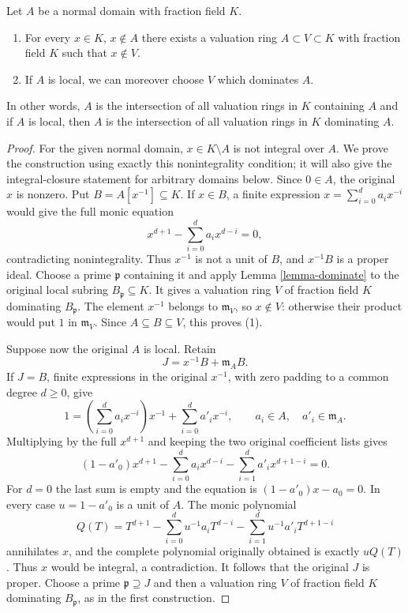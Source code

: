 \begin{lemma}
\label{lemma-find-valuation-rings}
Let $A$ be a normal domain with fraction field $K$.
\begin{enumerate}
\item For every $x \in K$, $x \not \in A$ there exists a valuation ring
$A \subset V \subset K$ with fraction field $K$ such that $x \not \in V$.
\item If $A$ is local, we can moreover choose $V$ which dominates $A$.
\end{enumerate}
In other words, $A$ is the intersection of all valuation rings in $K$
containing $A$ and if $A$ is local, then $A$ is the intersection of
all valuation rings in $K$ dominating $A$.
\end{lemma}

\begin{proof}
For the given normal domain,
$x\in K\setminus A$ is
not integral over $A$.
We prove the construction
using exactly this nonintegrality
condition; it will also give
the integral-closure statement
for arbitrary domains below.
Since $0\in A$, the original
$x$ is nonzero. Put
$B=A[x^{-1}]\subseteq K$.
If $x\in B$, a finite
expression
$x=\sum_{i=0}^d a_i x^{-i}$
would give the full monic
equation
$$
x^{d+1}-\sum_{i=0}^d a_i x^{d-i}=0,
$$
contradicting nonintegrality.
Thus $x^{-1}$ is not a
unit of $B$, and
$x^{-1}B$ is a proper
ideal. Choose a prime
$\mathfrak p$ containing it
and apply Lemma
\ref{lemma-dominate} to the
original local subring
$B_{\mathfrak p}\subseteq K$.
It gives a valuation ring
$V$ of fraction field $K$
dominating $B_{\mathfrak p}$.
The element $x^{-1}$ belongs
to $\mathfrak m_V$, so
$x\notin V$: otherwise
their product would put
$1$ in $\mathfrak m_V$.
Since $A\subseteq B\subseteq V$,
this proves (1).

Suppose now the original
$A$ is local. Retain
$$
J=x^{-1}B+\mathfrak m_A B.
$$
If $J=B$, finite expressions
in the original $x^{-1}$,
with zero padding to a
common degree $d\geq0$,
give
$$
1=\left(\sum_{i=0}^d a_i x^{-i}\right)x^{-1}
+\sum_{i=0}^d a'_i x^{-i},
\qquad a_i\in A,\quad a'_i\in\mathfrak m_A.
$$
Multiplying by the full
$x^{d+1}$ and keeping the
two original coefficient lists
gives
$$
(1-a'_0)x^{d+1}
-\sum_{i=0}^d a_i x^{d-i}
-\sum_{i=1}^d a'_i x^{d+1-i}=0.
$$
For $d=0$ the last sum
is empty and the equation
is $(1-a'_0)x-a_0=0$.
In every case $u=1-a'_0$
is a unit of $A$.
The monic polynomial
$$
Q(T)=T^{d+1}
-\sum_{i=0}^d u^{-1}a_i T^{d-i}
-\sum_{i=1}^d u^{-1}a'_i T^{d+1-i}
$$
annihilates $x$, and the
complete polynomial originally
obtained is exactly $uQ(T)$.
Thus $x$ would be integral,
a contradiction. It follows
that the original $J$ is
proper. Choose a prime
$\mathfrak p\supseteq J$ and
then a valuation ring $V$
of fraction field $K$
dominating $B_{\mathfrak p}$,
as in the first construction.


\end{proof}
